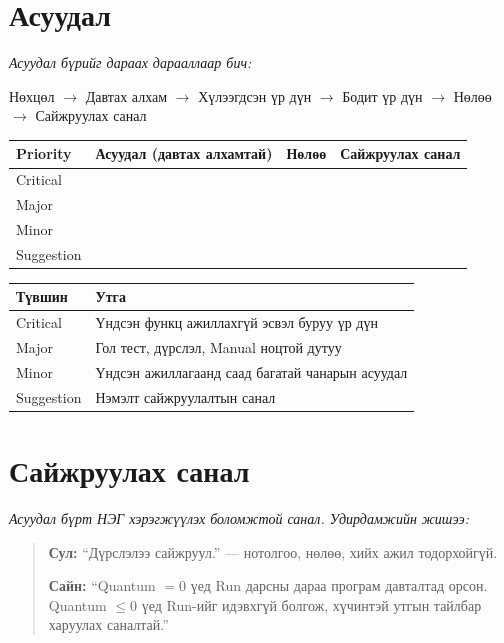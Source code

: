 \documentclass[11pt,a4paper]{article}
\begin{document}
\newpage
\section{Асуудал}
\emph{Асуудал бүрийг дараах дарааллаар бич:}
\begin{center}
Нөхцөл $\to$ Давтах алхам $\to$ Хүлээгдсэн үр дүн $\to$ Бодит үр дүн
$\to$ Нөлөө $\to$ Сайжруулах санал
\end{center}

\begin{center}
\small
\begin{tabular}{L{1.8cm}L{5.4cm}L{3.6cm}L{3.6cm}}
\toprule
Priority & Асуудал (давтах алхамтай) & Нөлөө & Сайжруулах санал \\
\midrule
Critical & & & \\[14pt]
Major & & & \\[14pt]
Minor & & & \\[14pt]
Suggestion & & & \\[14pt]
\bottomrule
\end{tabular}
\end{center}

\begin{center}
\small
\begin{tabular}{lL{11.0cm}}
\toprule
Түвшин & Утга \\
\midrule
Critical & Үндсэн функц ажиллахгүй эсвэл буруу үр дүн \\
Major & Гол тест, дүрслэл, Manual ноцтой дутуу \\
Minor & Үндсэн ажиллагаанд саад багатай чанарын асуудал \\
Suggestion & Нэмэлт сайжруулалтын санал \\
\bottomrule
\end{tabular}
\end{center}

\section{Сайжруулах санал}
\emph{Асуудал бүрт НЭГ хэрэгжүүлэх боломжтой санал. Удирдамжийн жишээ:}

\begin{quote}
\small
\textbf{Сул:} ``Дүрслэлээ сайжруул.'' --- нотолгоо, нөлөө, хийх ажил тодорхойгүй.

\textbf{Сайн:} ``Quantum $=0$ үед Run дарсны дараа програм давталтад орсон.
Quantum $\le 0$ үед Run-ийг идэвхгүй болгож, хүчинтэй утгын тайлбар
харуулах саналтай.''
\end{quote}
\end{document}
